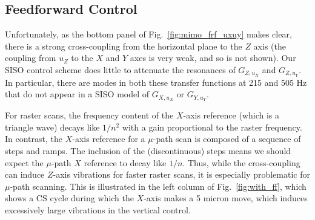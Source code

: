\documentclass[twocolumn,oneside]{IEEEtran/IEEEtran}
\begin{document}

\subsection{Feedforward Control}\label{sec:ff_control}
Unfortunately, as the bottom panel of Fig.~\ref{fig:mimo_frf_uxuy} makes clear, there is a strong cross-coupling from the horizontal plane to the $Z$ axis (the coupling from $u_Z$ to the $X$ and $Y$ axes is very weak, and so is not shown). Our SISO control scheme does little to attenuate the resonances of $G_{Z,u_X}$ and $G_{Z,u_Y}$. In particular, there are modes in both these transfer functions at 215 and 505 Hz that do not appear in a SISO model of $G_{X,u_X}$ or $G_{Y,u_Y}$.

For raster scans, the frequency content of the $X$-axis reference (which is a triangle wave) decays like $1/n^2$ with a gain proportional to the raster frequency. In contrast, the $X$-axis reference for a $\mu$-path scan is composed of a sequence of steps and ramps. The inclusion of the (discontinuous) steps means we should expect the $\mu$-path $X$ reference to decay like $1/n$. 
Thus,  while the cross-coupling can induce $Z$-axis vibrations for faster raster scans, it is especially problematic for $\mu$-path scanning. This is illustrated in the left column of Fig.~\ref{fig:with_ff}, which shows a CS cycle during which the $X$-axis makes a 5 micron move, which induces excessively large vibrations in the vertical control.
\end{document}
